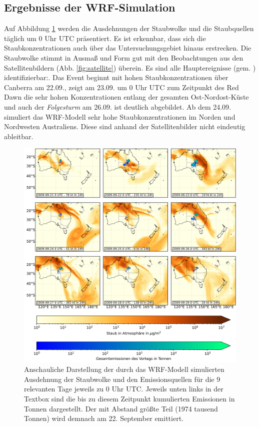\documentclass[12pt,a4paper,onecolumn]{scrartcl}
\begin{document}
\subsection{Ergebnisse der WRF-Simulation}
Auf Abbildung \ref{fig:dustload} werden die Ausdehnungen der Staubwolke und die Staubquellen täglich um 0 Uhr UTC präsentiert. Es ist erkennbar, dass sich die Staubkonzentrationen auch über das Untersuchungsgebiet hinaus erstrecken. Die Staubwolke stimmt in Ausmaß und Form gut mit den Beobachtungen aus den Satellitenbildern (Abb. \ref{fig:satellite}) überein. Es sind alle Hauptereignisse (gem. \cite{Leys.2009}) identifizierbar:. Das Event beginnt mit hohen Staubkonzentrationen über Canberra am 22.09., zeigt am 23.09. um 0 Uhr UTC zum Zeitpunkt des Red Dawn die sehr hohen Konzentrationen entlang der gesamten Ost-Nordost-Küste und auch der \textit{Folgesturm} am 26.09. ist deutlich abgebildet. Ab dem 24.09. simuliert das WRF-Modell sehr hohe Staubkonzentrationen im Norden und Nordwesten Australiens. Diese sind anhand der Satellitenbilder nicht eindeutig ableitbar. 
\begin{figure}
\includegraphics[width=\textwidth]{bilder/dustload.png}
\caption{Anschauliche Darstellung der durch das WRF-Modell simulierten Ausdehnung der Staubwolke und den Emissionsquellen für die 9 relevanten Tage jeweils zu 0 Uhr UTC. Jeweils unten links in der Textbox sind die bis zu diesem Zeitpunkt kumulierten Emissionen in Tonnen dargestellt. Der mit Abstand größte Teil (1974 tausend Tonnen) wird demnach am 22. September emittiert. } \label{fig:dustload}
\end{figure}
\end{document}
